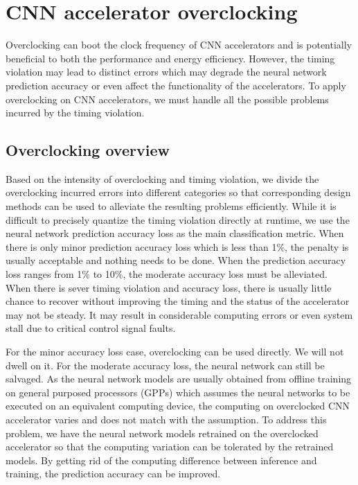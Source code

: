 \section{CNN accelerator overclocking} \label{sec:framework}
Overclocking can boot the clock frequency of CNN accelerators and is potentially beneficial to both 
the performance and energy efficiency. However, the timing violation may lead to distinct errors which 
may degrade the neural network prediction accuracy or even affect the functionality of the accelerators. 
To apply overclocking on CNN accelerators, we must handle all the possible 
problems incurred by the timing violation. 

\subsection{Overclocking overview}
Based on the intensity of overclocking and timing 
violation, we divide the overclocking incurred errors into different 
categories so that corresponding design methods can be used to 
alleviate the resulting problems efficiently. While it is difficult 
to precisely quantize the timing violation directly at runtime, we use 
the neural network prediction accuracy loss as the main 
classification metric. When there is only minor prediction accuracy 
loss which is less than 1\%, the penalty is usually acceptable 
and nothing needs to be done. When the prediction accuracy loss 
ranges from 1\% to 10\%, the moderate accuracy loss must be 
alleviated. When there is sever timing violation and 
accuracy loss, there is usually little chance to recover 
without improving the timing and the status of the accelerator 
may not be steady. It may result in considerable computing errors 
or even system stall due to critical control signal faults.  

For the minor accuracy loss case, overclocking can be used directly. 
We will not dwell on it. For the moderate accuracy loss, the neural network 
can still be salvaged. As the neural network models are usually obtained 
from offline training on general purposed processors (GPPs) which assumes the 
neural networks to be executed on an equivalent computing device, 
the computing on overclocked CNN accelerator varies and does not match 
with the assumption. To address this problem, we have the neural network models 
retrained on the overclocked accelerator so that the computing variation can be 
tolerated by the retrained models. By getting rid of the computing difference between 
inference and training, the prediction accuracy can be improved.

